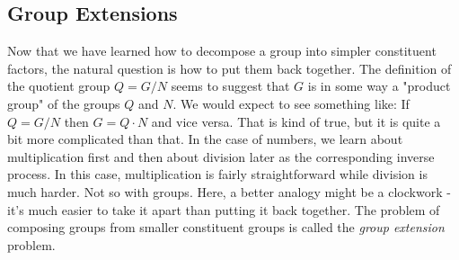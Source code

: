 












\subsection{Group Extensions}
Now that we have learned how to decompose a group into simpler constituent factors, the natural question is how to put them back together. The definition of the quotient group $Q = G / N$ seems to suggest that $G$ is in some way a "product group" of the groups $Q$ and $N$. We would expect to see something like: If $Q = G / N$ then $G = Q \cdot N$ and vice versa. That is kind of true, but it is quite a bit more complicated than that. In the case of numbers, we learn about multiplication first and then about division later as the corresponding inverse process. In this case, multiplication is fairly straightforward while division is much harder. Not so with groups. Here, a better analogy might be a clockwork - it's much easier to take it apart than putting it back together. The problem of composing groups from smaller constituent groups is called the \emph{group extension} problem. 

